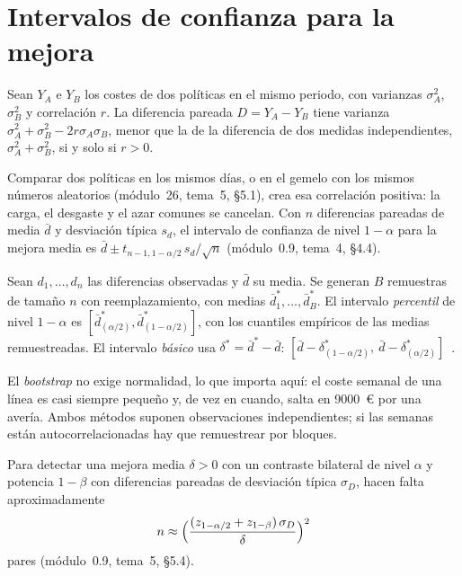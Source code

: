 \section{Intervalos de confianza para la mejora}

\begin{proposicion}\label{prop:pareado}
Sean $Y_A$ e $Y_B$ los costes de dos políticas en el mismo periodo, con varianzas $\sigma_A^{2}$, $\sigma_B^{2}$ y correlación $r$. La diferencia pareada $D=Y_A-Y_B$ tiene varianza $\sigma_A^{2}+\sigma_B^{2}-2r\sigma_A\sigma_B$, menor que la de la diferencia de dos medidas independientes, $\sigma_A^{2}+\sigma_B^{2}$, si y solo si $r>0$.
\end{proposicion}

Comparar dos políticas en los mismos días, o en el gemelo con los mismos números aleatorios (módulo~26, tema~5, §5.1), crea esa correlación positiva: la carga, el desgaste y el azar comunes se cancelan. Con $n$ diferencias pareadas de media $\bar d$ y desviación típica $s_d$, el intervalo de confianza de nivel $1-\alpha$ para la mejora media es $\bar d\pm t_{n-1,1-\alpha/2}\,s_d/\sqrt n$ (módulo~0.9, tema~4, §4.4).

\begin{definicion}\label{def:bootstrap}
Sean $d_1,\dots,d_n$ las diferencias observadas y $\bar d$ su media. Se generan $B$ remuestras de tamaño $n$ con reemplazamiento, con medias $\bar d^{*}_1,\dots,\bar d^{*}_B$. El intervalo \emph{percentil} de nivel $1-\alpha$ es $[\bar d^{*}_{(\alpha/2)},\bar d^{*}_{(1-\alpha/2)}]$, con los cuantiles empíricos de las medias remuestreadas. El intervalo \emph{básico} usa $\delta^{*}=\bar d^{*}-\bar d$: $[\bar d-\delta^{*}_{(1-\alpha/2)},\ \bar d-\delta^{*}_{(\alpha/2)}]$~\cite{mit1805}.
\end{definicion}

El \emph{bootstrap} no exige normalidad, lo que importa aquí: el coste semanal de una línea es casi siempre pequeño y, de vez en cuando, salta en 9000~€ por una avería. Ambos métodos suponen observaciones independientes; si las semanas están autocorrelacionadas hay que remuestrear por bloques.

\begin{proposicion}\label{prop:tamano}
Para detectar una mejora media $\delta>0$ con un contraste bilateral de nivel $\alpha$ y potencia $1-\beta$ con diferencias pareadas de desviación típica $\sigma_D$, hacen falta aproximadamente
\[
n\approx\Bigl(\frac{(z_{1-\alpha/2}+z_{1-\beta})\,\sigma_D}{\delta}\Bigr)^{2}
\]
pares (módulo~0.9, tema~5, §5.4).
\end{proposicion}

